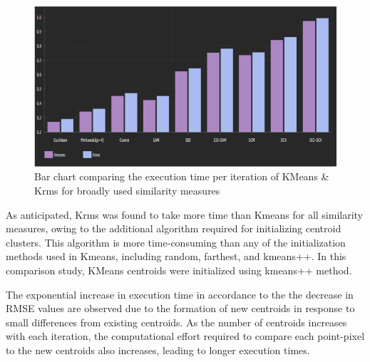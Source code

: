 \documentclass{article}
\begin{document}
{                    
                    \begin{figure}[h]
                        \centering
                        \includegraphics[width=1\textwidth]{Figures/km-krms.PNG}
                        \caption{Bar chart comparing the execution time per iteration of KMeans \& Krms for broadly used similarity measures}
                        \label{fig:my_label}
                    \end{figure}
                    
                    As anticipated, Krms was found to take more time than Kmeans for all similarity measures, owing to the additional algorithm required for initializing centroid clusters. This algorithm is more time-consuming than any of the initialization methods used in Kmeans, including random, farthest, and kmeans++. In this comparison study, KMeans centroids were initialized using kmeans++ method.\par
                    \vspace*{1\baselineskip}
                    
                    
                
                    The exponential increase in execution time in accordance to the the decrease in RMSE values are observed due to the formation of new centroids in response to small differences from existing centroids. As the number of centroids increases with each iteration, the computational effort required to compare each point-pixel to the new centroids also increases, leading to longer execution times.\par
                    
}
\end{document}
